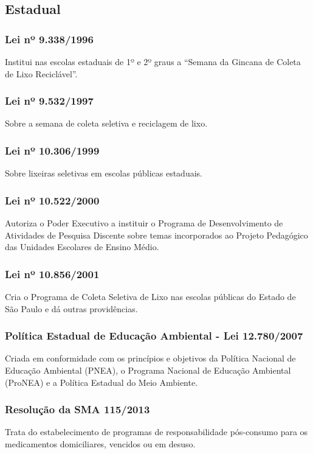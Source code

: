 \begin{subapend}
	\subsection{Estadual}
	\begin{subsubapend}
		\subsubsection{Lei nº 9.338/1996}
		Institui nas escolas estaduais de 1º e 2º graus a “Semana da Gincana de Coleta de Lixo Reciclável”.
		\subsubsection{Lei nº 9.532/1997}
		Sobre a semana de coleta seletiva e reciclagem de lixo.
		\subsubsection{Lei nº 10.306/1999}
		Sobre lixeiras seletivas em escolas públicas estaduais.
		\subsubsection{Lei nº 10.522/2000}
		Autoriza o Poder Executivo a instituir o Programa de Desenvolvimento de Atividades de Pesquisa Discente sobre temas incorporados ao Projeto Pedagógico das Unidades Escolares de Ensino Médio.
		\subsubsection{Lei nº 10.856/2001}
		Cria o Programa de Coleta Seletiva de Lixo nas escolas públicas do Estado de São Paulo e dá outras providências.
		\subsubsection{Política Estadual de Educação Ambiental - Lei 12.780/2007}
		Criada em conformidade com os princípios e objetivos da Política Nacional de Educação Ambiental (PNEA), o Programa Nacional de Educação Ambiental (ProNEA) e a Política Estadual do Meio Ambiente.
		\subsubsection{Resolução da SMA 115/2013}
		Trata do estabelecimento de programas de responsabilidade pós-consumo para os medicamentos domiciliares, vencidos ou em desuso.
	\end{subsubapend}
\end{subapend}

